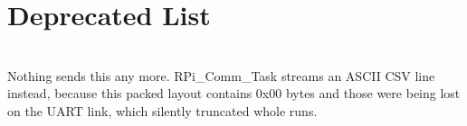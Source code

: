\chapter{Deprecated List }
\hypertarget{deprecated}{}\label{deprecated}

\begin{DoxyRefList}
\item[{\parbox[t]{\linewidth}{Struct \doxylink{structRPi__Packet__t}{RPi\+\_\+\+Packet\+\_\+t} }}]\hfill \\
\label{deprecated__deprecated000001}%
%
Nothing sends this any more. {\ttfamily RPi\+\_\+\+Comm\+\_\+\+Task} streams an ASCII CSV line instead, because this packed layout contains {\ttfamily 0x00} bytes and those were being lost on the UART link, which silently truncated whole runs.
\end{DoxyRefList}